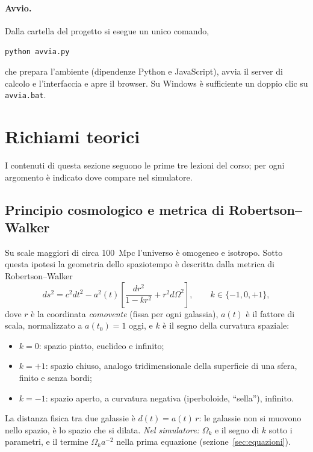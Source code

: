\documentclass[11pt,a4paper]{article}
\newcommand{\Ok}{\Omega_k}
\begin{document}
\paragraph{Avvio.} Dalla cartella del progetto si esegue un unico comando,
\begin{center}\texttt{python avvia.py}\end{center}
che prepara l'ambiente (dipendenze Python e JavaScript), avvia il server di calcolo e l'interfaccia e apre il browser. Su Windows è sufficiente un doppio clic su \texttt{avvia.bat}.

\section{Richiami teorici}
I contenuti di questa sezione seguono le prime tre lezioni del corso; per ogni argomento è indicato dove compare nel simulatore.

\subsection{Principio cosmologico e metrica di Robertson--Walker}
Su scale maggiori di circa \SI{100}{Mpc} l'universo è omogeneo e isotropo. Sotto questa ipotesi la geometria dello spaziotempo è descritta dalla metrica di Robertson--Walker
\begin{equation}
  ds^2 = c^2dt^2 - a^2(t)\left[\frac{dr^2}{1-kr^2} + r^2 d\Omega^2\right], \qquad k\in\{-1,0,+1\},
  \label{eq:rw}
\end{equation}
dove $r$ è la coordinata \emph{comovente} (fissa per ogni galassia), $a(t)$ è il fattore di scala, normalizzato a $a(t_0)=1$ oggi, e $k$ è il segno della curvatura spaziale:
\begin{itemize}
  \item $k=0$: spazio piatto, euclideo e infinito;
  \item $k=+1$: spazio chiuso, analogo tridimensionale della superficie di una sfera, finito e senza bordi;
  \item $k=-1$: spazio aperto, a curvatura negativa (iperboloide, ``sella''), infinito.
\end{itemize}
La distanza fisica tra due galassie è $d(t)=a(t)\,r$: le galassie non si muovono nello spazio, è lo spazio che si dilata.
\emph{Nel simulatore:} $\Ok$ e il segno di $k$ sotto i parametri, e il termine $\Ok a^{-2}$ nella prima equazione (sezione~\ref{sec:equazioni}).
\end{document}
